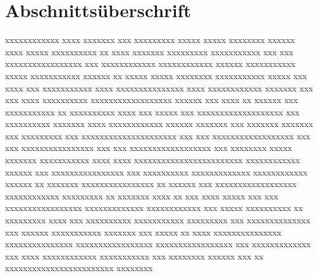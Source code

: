 \section{Abschnittsüberschrift}\label{sec:xx}
xxxxxxxxxxxx xxxx xxxxxxx xxx xxxxxxxxx xxxxx xxxxx xxxxxxxx xxxxxx xxxx xxxxx xxxxxxxxxx xx xxxx xxxxxxx xxxxxxxxx xxxxxxxxxxx xxx xxx xxxxxxxxxxxxxxxxx xxx xxxxxxxxxxxx xxxxxxxxxxxx xxxxxx xxxxxxxxxxx xxxxx xxxxxxxxxxx xxxxxx xx xxxxx xxxxx xxxxxxxx xxxxxxxxxxx xxxxx xxx xxxx xxx xxxxxxxxxxx xxxx xxxxxxxxxxxxxxx xxxx xxxxxxxxxxxx xxxxxxx xxx xxx xxxx xxxxxxxxxx xxxxxxxxxxxxxxxxxx xxxxxx xxx xxxx xx xxxxxx xxx xxxxxxxxxxx xx xxxxxxxxxx xxxx xxx xxxxx xxx xxxxxxxxxxxxxxxxxxx xxx xxxxxxxxxx xxxxxxx xxxx xxxxxxxxxxxx xxxxxx xxxxxxx \cite{KEYD} xxx xxxxxxx xxxxxxx xxx xxxxxxxxx xxx xxxxxxxxxxxxxxxxxxxxx xxx xxx xxxxxxxxxxxxxxxxxx xxx xxx xxxxxxxxxxxxxxxx xxx xxx xxxxxxxxxxxxxxxxxx xxx xxxxxxxx xxxxx xxxxxxx xxxxxxxxxxx xxxx xxxx xxxxxxxxxxxxxxxxxxxxxxxx xxxxxxxxxxxx xxxxxx xxx xxxxxxxxxxxxxxxx xxx xxxxxxxxxx xxxxxxxxxxxxx xxxxxxxxxxxx xxxxxx xx xxxxxxx xxxxxxxxxxxxxxxx xx xxxxxx xxx xxxxxxxxxxxxxxxxxx xxxxxxxxxxxx xxxxxxxxx xx xxxxxxx xxxx xx xxx xxxx xxxxx xxx xxx xxxxxxxxxxxxxxxxx xxxxxxxxxxxxx xxxxxxxxxxxx xxx xxxxx xxxxxxxxxx xx xxxxxxxxx xxxx xxx xxxxxxxxxx xxxxxxxxxxx xxxxxxxxx xxx xxxxxxxxxxxxxx xxx xxxxxx xxxxxxxxxxx xxxxxxx xxx xxxxx xx xxxx xxxxxxxxxxxxxxx \cite{KEYF} xxxxxxxxxxxxxxx xxxxxxxxxxxxxxxxx xxxxxxxxxxxxxxxxx xxx xxxxxxxxxxxxx xxx xxxx xxxxxxxxxxxx xxxxxxxxxxx xxx xxxxxxxx xxxxxx xxx xx xxxxxxxxxxxxxxxxxxxxxxxx xxxxxxxx
